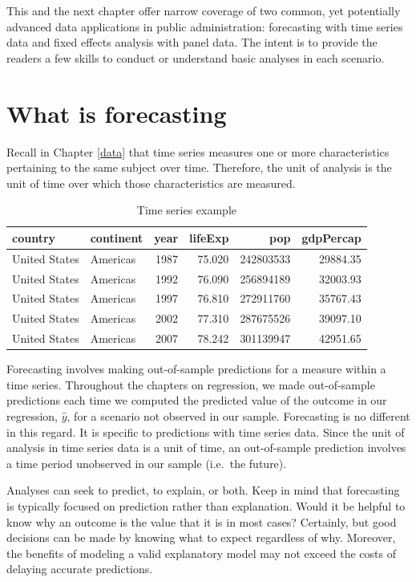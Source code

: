 \documentclass[
]{book}
\begin{document}
This and the next chapter offer narrow coverage of two common, yet potentially advanced data applications in public administration: forecasting with time series data and fixed effects analysis with panel data. The intent is to provide the readers a few skills to conduct or understand basic analyses in each scenario.

\hypertarget{what-is-forecasting}{%
\section{What is forecasting}\label{what-is-forecasting}}

Recall in Chapter \ref{data} that time series measures one or more characteristics pertaining to the same subject over time. Therefore, the unit of analysis is the unit of time over which those characteristics are measured.

\begin{table}

\caption{\label{tab:timeseriesrep}Time series example}
\centering
\begin{tabular}[t]{l|l|r|r|r|r}
\hline
country & continent & year & lifeExp & pop & gdpPercap\\
\hline
United States & Americas & 1987 & 75.020 & 242803533 & 29884.35\\
\hline
United States & Americas & 1992 & 76.090 & 256894189 & 32003.93\\
\hline
United States & Americas & 1997 & 76.810 & 272911760 & 35767.43\\
\hline
United States & Americas & 2002 & 77.310 & 287675526 & 39097.10\\
\hline
United States & Americas & 2007 & 78.242 & 301139947 & 42951.65\\
\hline
\end{tabular}
\end{table}

Forecasting involves making out-of-sample predictions for a measure within a time series. Throughout the chapters on regression, we made out-of-sample predictions each time we computed the predicted value of the outcome in our regression, \(\hat{y}\), for a scenario not observed in our sample. Forecasting is no different in this regard. It is specific to predictions with time series data. Since the unit of analysis in time series data is a unit of time, an out-of-sample prediction involves a time period unobserved in our sample (i.e.~the future).

Analyses can seek to predict, to explain, or both. Keep in mind that forecasting is typically focused on prediction rather than explanation. Would it be helpful to know why an outcome is the value that it is in most cases? Certainly, but good decisions can be made by knowing what to expect regardless of why. Moreover, the benefits of modeling a valid explanatory model may not exceed the costs of delaying accurate predictions.
\end{document}
